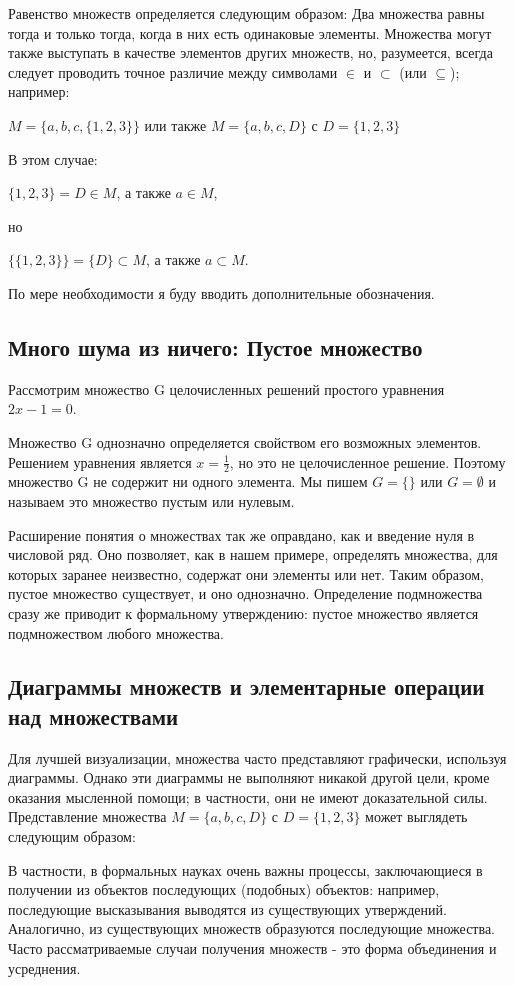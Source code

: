 Равенство множеств определяется следующим образом: Два множества равны тогда и только тогда, когда в них есть одинаковые элементы. Множества могут также выступать в качестве элементов других множеств, но, разумеется, всегда следует проводить точное различие между символами \(\in\) и \(\subset\) (или \(\subseteq\)); например:

\vspace{0.5cm}
\(M = \{a,b,c,\{1,2,3\}\}\) или также \(M = \{a,b,c,D\}\) с \(D=\{1,2,3\}\)
\vspace{0.5cm}

В этом случае:

\vspace{0.5cm}
\(\{1,2,3\}=D \in M\), а также \(a \in M\),

но

\(\{\{1,2,3\}\}=\{D\} \subset M\), а также \(a \subset M\).
\vspace{0.5cm}

По мере необходимости я буду вводить дополнительные обозначения.

\subsection{Много шума из ничего: Пустое множество}
Рассмотрим множество G целочисленных решений простого уравнения \(2x-1=0\).

Множество G однозначно определяется свойством его возможных элементов.
Решением уравнения является \(x=\frac{1}{2}\), но это не целочисленное решение.
Поэтому множество G не содержит ни одного элемента. Мы пишем \(G=\{\}\) или \(G=\emptyset\) и называем это множество пустым или нулевым.

Расширение понятия о множествах так же оправдано, как и введение нуля в числовой ряд.
Оно позволяет, как в нашем примере, определять множества, для которых заранее неизвестно, содержат они элементы или нет.
Таким образом, пустое множество существует, и оно однозначно.
Определение подмножества сразу же приводит к формальному утверждению: пустое множество является подмножеством любого множества.

\subsection{Диаграммы множеств и элементарные операции над множествами}
Для лучшей визуализации, множества часто представляют графически, используя диаграммы.
Однако эти диаграммы не выполняют никакой другой цели, кроме оказания мысленной помощи;
в частности, они не имеют доказательной силы. Представление множества \(M = \{a, b, c, D\}\) с \(D=\{1, 2, 3\}\) может выглядеть следующим образом:

В частности, в формальных науках очень важны процессы, заключающиеся в получении из объектов последующих (подобных) объектов: например, последующие высказывания выводятся из существующих утверждений.
Аналогично, из существующих множеств образуются последующие множества.
Часто рассматриваемые случаи получения множеств - это форма объединения и усреднения.

